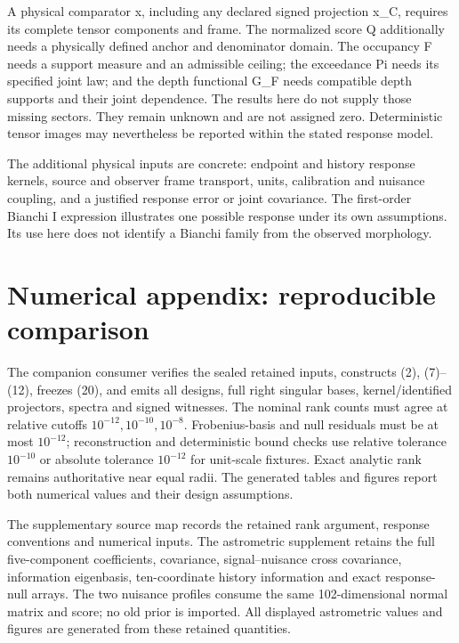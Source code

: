\documentclass[aps,prd,preprint,onecolumn,notitlepage]{revtex4-2}
\begin{document}
A physical comparator x, including any declared signed projection x\_C, requires its complete tensor components and frame. The normalized score Q additionally needs a physically defined anchor and denominator domain. The occupancy F needs a support measure and an admissible ceiling; the exceedance Pi needs its specified joint law; and the depth functional G\_F needs compatible depth supports and their joint dependence. The results here do not supply those missing sectors. They remain unknown and are not assigned zero. Deterministic tensor images may nevertheless be reported within the stated response model.

The additional physical inputs are concrete: endpoint and history response kernels, source and observer frame transport, units, calibration and nuisance coupling, and a justified response error or joint covariance. The first-order Bianchi I expression illustrates one possible response under its own assumptions. Its use here does not identify a Bianchi family from the observed morphology.

\hypertarget{numerical-appendix-reproducible-comparison}{%
\appendix
\section{Numerical appendix: reproducible comparison}\label{numerical-appendix-reproducible-comparison}}

The companion consumer verifies the sealed retained inputs, constructs (2), (7)--(12), freezes (20), and emits all designs, full right singular bases, kernel/identified projectors, spectra and signed witnesses. The nominal rank counts must agree at relative cutoffs \(10^{-12},10^{-10},10^{-8}\). Frobenius-basis and null residuals must be at most \(10^{-12}\); reconstruction and deterministic bound checks use relative tolerance \(10^{-10}\) or absolute tolerance \(10^{-12}\) for unit-scale fixtures. Exact analytic rank remains authoritative near equal radii. The generated tables and figures report both numerical values and their design assumptions.

The supplementary source map records the retained rank argument, response conventions and numerical inputs. The astrometric supplement retains the full five-component coefficients, covariance, signal--nuisance cross covariance, information eigenbasis, ten-coordinate history information and exact response-null arrays. The two nuisance profiles consume the same 102-dimensional normal matrix and score; no old prior is imported. All displayed astrometric values and figures are generated from these retained quantities.
\end{document}
